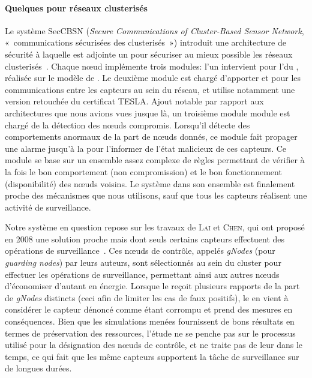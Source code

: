 \paragraph{Quelques \IDS pour réseaux clusterisés}
Le système SecCBSN (\textit{Secure Communications of Cluster-Based Sensor Network}, « communications sécurisées des \rcs clusterisés ») introduit une architecture de sécurité à laquelle est adjointe un \ids pour sécuriser au mieux possible les réseaux clusterisés~\cite{HHC07}.
Chaque nœud implémente trois modules: l'un intervient pour l'\election du \ch, réalisée sur le modèle de \leach.
Le deuxième module est chargé d'apporter  et  pour les communications entre les capteurs au sein du réseau, et utilise notamment une version retouchée du certificat TESLA.
Ajout notable par rapport aux architectures que nous avions vues jusque là, un troisième module module est chargé de la détection des nœuds compromis.
Lorsqu'il détecte des comportements anormaux de la part de nœuds donnés, ce module fait propager une alarme jusqu'à la \sdb pour l'informer de l'état malicieux de ces capteurs.
Ce module se base sur un ensemble assez complexe de règles permettant de vérifier à la fois le bon comportement (non compromission) et le bon fonctionnement (disponibilité) des nœuds voisins.
Le système dans son ensemble est finalement proche des mécanismes que nous utilisons, sauf que tous les capteurs réalisent une activité de surveillance.

Notre système en question repose sur les travaux de \textsc{Lai} et \textsc{Chen}, qui ont proposé en 2008 une solution proche mais dont seuls certains capteurs effectuent des opérations de surveillance~\cite{LC08}.
Ces nœuds de contrôle, appelés \textit{gNodes} (pour \textit{guarding nodes}) par leurs auteurs, sont sélectionnés au sein du cluster pour effectuer les opérations de surveillance, permettant ainsi aux autres nœuds d'économiser d'autant en énergie.
Lorsque le \ch reçoit plusieurs rapports de la part de \textit{gNodes} distincts (ceci afin de limiter les cas de faux positifs), le \CH en vient à considérer le capteur dénoncé comme étant corrompu et prend des mesures en conséquences.
Bien que les simulations menées fournissent de bons résultats en termes de préservation des ressources, l'étude ne se penche pas sur le processus utilisé pour la désignation des nœuds de contrôle, et ne traite pas de leur  dans le temps, ce qui fait que les même capteurs supportent la tâche de surveillance sur de longues durées.

